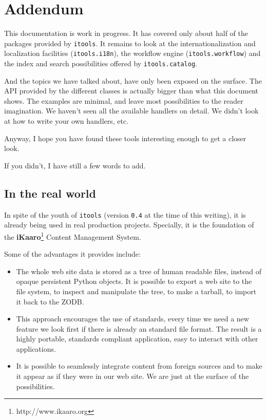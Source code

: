 \chapter{Addendum}

This documentation is work in progress. It has covered only about half of
the packages provided by {\tt itools}. It remains to look at the
internationalization and localization facilities ({\tt itools.i18n}), the
workflow engine ({\tt itools.workflow}) and the index and search
possibilities offered by {\tt itools.catalog}.

And the topics we have talked about, have only been exposed on the surface.
The API provided by the different classes is actually bigger than what this
document shows. The examples are minimal, and leave most possibilities to
the reader imagination. We haven't seen all the available handlers on detail.
We didn't look at how to write your own handlers, etc.

Anyway, I hope you have found these tools interesting enough to get a closer
look.

If you didn't, I have still a few words to add.


\section{In the real world}

In spite of the youth of {\tt itools} (version {\tt 0.4} at the time of this
writing), it is already being used in real production projects. Specially,
it is the foundation of the {\bf iKaaro}\footnote{http://www.ikaaro.org}
Content Management System.

Some of the advantages it provides include:

\begin{itemize}
  \item The whole web site data is stored as a tree of human readable
    files, instead of opaque persistent Python objects. It is possible
    to export a web site to the file system, to inspect and manipulate
    the tree, to make a tarball, to import it back to the ZODB.

  \item This approach encourages the use of standards, every time we
    need a new feature we look first if there is already an standard
    file format. The result is a highly portable, standards compliant
    application, easy to interact with other applications.

  \item It is possible to seamlessly integrate content from foreign
    sources and to make it appear as if they were in our web site.
    We are just at the surface of the possibilities.
\end{itemize}

